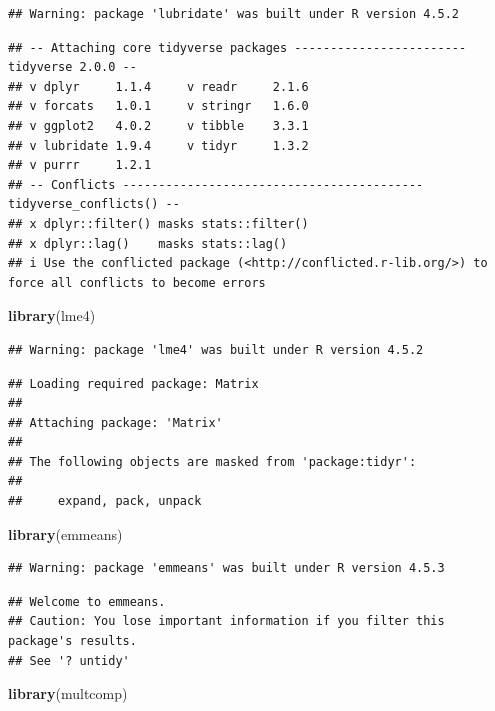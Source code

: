 \documentclass[
]{article}
\newenvironment{Shaded}{\begin{snugshade}}{\end{snugshade}}
\newcommand{\FunctionTok}[1]{\textcolor[rgb]{0.13,0.29,0.53}{\textbf{#1}}}
\newcommand{\NormalTok}[1]{#1}
\begin{document}
\begin{verbatim}
## Warning: package 'lubridate' was built under R version 4.5.2
\end{verbatim}

\begin{verbatim}
## -- Attaching core tidyverse packages ------------------------ tidyverse 2.0.0 --
## v dplyr     1.1.4     v readr     2.1.6
## v forcats   1.0.1     v stringr   1.6.0
## v ggplot2   4.0.2     v tibble    3.3.1
## v lubridate 1.9.4     v tidyr     1.3.2
## v purrr     1.2.1     
## -- Conflicts ------------------------------------------ tidyverse_conflicts() --
## x dplyr::filter() masks stats::filter()
## x dplyr::lag()    masks stats::lag()
## i Use the conflicted package (<http://conflicted.r-lib.org/>) to force all conflicts to become errors
\end{verbatim}

\begin{Shaded}
\begin{Highlighting}[]
\FunctionTok{library}\NormalTok{(lme4)}
\end{Highlighting}
\end{Shaded}

\begin{verbatim}
## Warning: package 'lme4' was built under R version 4.5.2
\end{verbatim}

\begin{verbatim}
## Loading required package: Matrix
## 
## Attaching package: 'Matrix'
## 
## The following objects are masked from 'package:tidyr':
## 
##     expand, pack, unpack
\end{verbatim}

\begin{Shaded}
\begin{Highlighting}[]
\FunctionTok{library}\NormalTok{(emmeans)}
\end{Highlighting}
\end{Shaded}

\begin{verbatim}
## Warning: package 'emmeans' was built under R version 4.5.3
\end{verbatim}

\begin{verbatim}
## Welcome to emmeans.
## Caution: You lose important information if you filter this package's results.
## See '? untidy'
\end{verbatim}

\begin{Shaded}
\begin{Highlighting}[]
\FunctionTok{library}\NormalTok{(multcomp)}
\end{Highlighting}
\end{Shaded}
\end{document}

